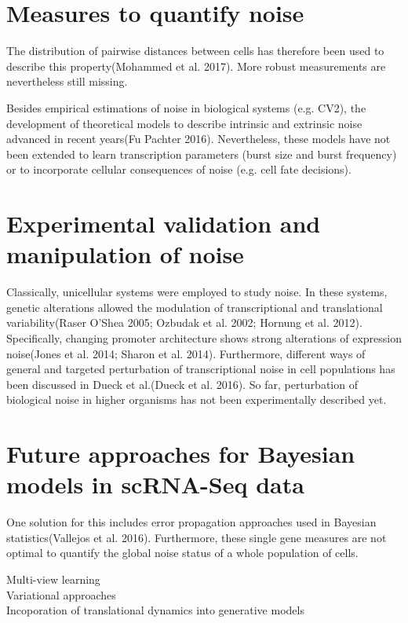 \section{Measures to quantify noise}

 The distribution of pairwise distances between cells has therefore been used to describe this property(Mohammed et al. 2017). More robust measurements are nevertheless still missing.
 
 Besides empirical estimations of noise in biological systems (e.g. CV2), the development of theoretical models to describe intrinsic and extrinsic noise advanced in recent years(Fu Pachter 2016). Nevertheless, these models have not been extended to learn transcription parameters (burst size and burst frequency) or to incorporate cellular consequences of noise (e.g. cell fate decisions).

\section{Experimental validation and manipulation of noise}

Classically, unicellular systems were employed to study noise. In these systems, genetic alterations allowed the modulation of transcriptional and translational variability(Raser O’Shea 2005; Ozbudak et al. 2002; Hornung et al. 2012). Specifically, changing promoter architecture shows strong alterations of expression noise(Jones et al. 2014; Sharon et al. 2014). Furthermore, different ways of general and targeted perturbation of transcriptional noise in cell populations has been discussed in Dueck et al.(Dueck et al. 2016). So far, perturbation of biological noise in higher organisms has not been experimentally described yet.


\section{Future approaches for Bayesian models in scRNA-Seq data}

One solution for this includes error propagation approaches used in Bayesian statistics(Vallejos et al. 2016). Furthermore, these single gene measures are not optimal to quantify the global noise status of a whole population of cells.

Multi-view learning\\
Variational approaches\\
Incoporation of translational dynamics into generative models

